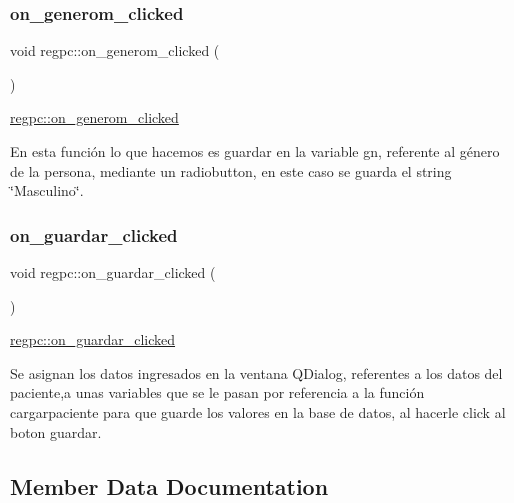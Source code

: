 \subsubsection{\texorpdfstring{on\+\_\+generom\+\_\+clicked}{on\_generom\_clicked}}
{\footnotesize\ttfamily void regpc\+::on\+\_\+generom\+\_\+clicked (\begin{DoxyParamCaption}{ }\end{DoxyParamCaption})\hspace{0.3cm}{\ttfamily [slot]}}



\hyperlink{classregpc_a5e7c8c456ee0a0a51e341d00bd0d8ba3}{regpc\+::on\+\_\+generom\+\_\+clicked} 

En esta función lo que hacemos es guardar en la variable gn, referente al género de la persona, mediante un radiobutton, en este caso se guarda el string \char`\"{}\+Masculino\char`\"{}. \mbox{\label{classregpc_a0126d0e41901f442a138c3fc2236df9a}} 
\subsubsection{\texorpdfstring{on\+\_\+guardar\+\_\+clicked}{on\_guardar\_clicked}}
{\footnotesize\ttfamily void regpc\+::on\+\_\+guardar\+\_\+clicked (\begin{DoxyParamCaption}{ }\end{DoxyParamCaption})\hspace{0.3cm}{\ttfamily [slot]}}



\hyperlink{classregpc_a0126d0e41901f442a138c3fc2236df9a}{regpc\+::on\+\_\+guardar\+\_\+clicked} 

Se asignan los datos ingresados en la ventana Q\+Dialog, referentes a los datos del paciente,a unas variables que se le pasan por referencia a la función cargarpaciente para que guarde los valores en la base de datos, al hacerle click al boton guardar. 

\subsection{Member Data Documentation}
\mbox{\label{classregpc_ad9477593f0a84b7cf606338133d48a48}} 
